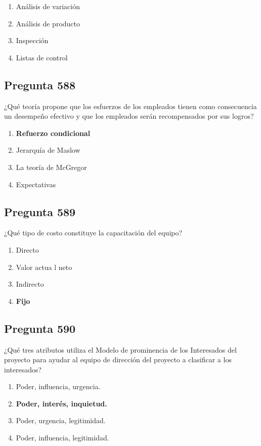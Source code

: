 \documentclass[11pt,a4paper]{article}
\begin{document}
\begin{enumerate}[label=\alph*)]
  \item Análisis de variación
  \item Análisis de producto
  \item Inspección
  \item Listas de control
\end{enumerate}

\subsection*{Pregunta 588}
¿Qué teoría propone que los esfuerzos de los empleados tienen como consecuencia un desempeño efectivo y que los empleados serán recompensados por sus logros?

\begin{enumerate}[label=\alph*)]
  \item \textbf{Refuerzo condicional}
  \item Jerarquía de Maslow
  \item La teoría de McGregor
  \item Expectativas
\end{enumerate}

\subsection*{Pregunta 589}
¿Qué tipo de costo constituye la capacitación del equipo?

\begin{enumerate}[label=\alph*)]
  \item Directo
  \item Valor actua l neto
  \item Indirecto
  \item \textbf{Fijo}
\end{enumerate}

\subsection*{Pregunta 590}
¿Qué tres atributos utiliza el Modelo de prominencia de los Interesados del proyecto para ayudar al equipo de dirección del proyecto a clasificar a los interesados?

\begin{enumerate}[label=\alph*)]
  \item Poder, influencia, urgencia.
  \item \textbf{Poder, interés, inquietud.}
  \item Poder, urgencia, legitimidad.
  \item Poder, influencia, legitimidad.
\end{enumerate}
\end{document}
